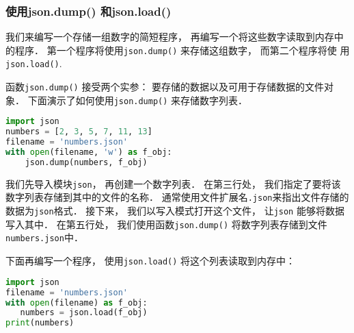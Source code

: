 \subsubsection{使用json.dump() 和json.load()}
我们来编写一个存储一组数字的简短程序， 再编写一个将这些数字读取到内存中的程序． 第一个程序将使用\verb|json.dump()| 来存储这组数字， 而第二个程序将使
用\verb|json.load()|.

函数\verb|json.dump()| 接受两个实参： 要存储的数据以及可用于存储数据的文件对象． 下面演示了如何使用\verb|json.dump()| 来存储数字列表．
\begin{lstlisting}[language=python]
import json
numbers = [2, 3, 5, 7, 11, 13]
filename = 'numbers.json'
with open(filename, 'w') as f_obj:
    json.dump(numbers, f_obj)
\end{lstlisting}
我们先导入模块\verb|json|， 再创建一个数字列表． 在第三行处， 我们指定了要将该数字列表存储到其中的文件的名称． 通常使用文件扩展名\verb|.json|来指出文件存储的数据为\verb|json|格式． 接下来， 我们以写入模式打开这个文件， 让\verb|json| 能够将数据写入其中． 在第五行处， 我们使用函数\verb|json.dump()| 将数字列表存储到文件\verb|numbers.json|中．

下面再编写一个程序， 使用\verb|json.load()| 将这个列表读取到内存中：

\begin{lstlisting}[language=python]
import json
filename = 'numbers.json'
with open(filename) as f_obj:
   numbers = json.load(f_obj)
print(numbers)
\end{lstlisting}
